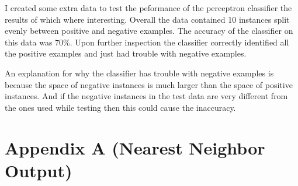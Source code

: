 \documentclass[a4paper, 12pt]{article}
\begin{document}
  		I created some extra data to test the peformance of the perceptron classifier the results of which where interesting. Overall the data contained 10 instances split evenly between positive and negative examples. The accuracy of the classifier on this data was $70\%$. Upon further inspection the classifier correctly identified all the positive examples and just had trouble with negative examples.
  		
  		An explanation for why the classifier has trouble with negative examples is because the space of negative instances is much larger than the space of positive instances. And if the negative instances in the test data are very different from the ones used while testing then this could cause the inaccuracy.
  			
  	
	\newpage  	
  	
	\section{Appendix A (Nearest Neighbor Output)}
\end{document}
